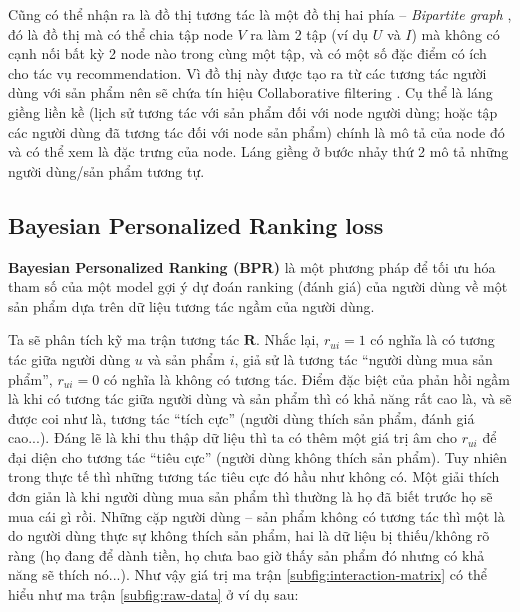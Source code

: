 Cũng có thể nhận ra là đồ thị tương tác là một đồ thị hai phía -- \textit{Bipartite graph} \cite{bipartite-graph-partition}, đó là đồ thị mà có thể chia tập node $V$ ra làm 2 tập (ví dụ $U$ và $I$) mà không có cạnh nối bất kỳ 2 node nào trong cùng một tập, và có một số đặc điểm có ích cho tác vụ recommendation. Vì đồ thị này được tạo ra từ các tương tác người dùng với sản phẩm nên sẽ chứa tín hiệu Collaborative filtering \cite{MGAT}. Cụ thể là láng giềng liền kề (lịch sử tương tác với sản phẩm đối với node người dùng; hoặc tập các người dùng đã tương tác đối với node sản phẩm) chính là mô tả của node đó và có thể xem là đặc trưng của node. Láng giềng ở bước nhảy thứ 2 mô tả những người dùng/sản phẩm tương tự.

\subsection{Bayesian Personalized Ranking loss}
\noindent \textbf{Bayesian Personalized Ranking (BPR)} \cite{BPR-loss} là một phương pháp để tối ưu hóa tham số của một model gợi ý dự đoán ranking (đánh giá) của người dùng về một sản phẩm dựa trên dữ liệu tương tác ngầm của người dùng.

Ta sẽ phân tích kỹ ma trận tương tác $\mathbf{R}$. Nhắc lại, $r_{ui} = 1$ có nghĩa là có tương tác giữa người dùng $u$ và sản phẩm $i$, giả sử là tương tác ``người dùng mua sản phẩm'', $r_{ui} = 0$ có nghĩa là không có tương tác. Điểm đặc biệt của phản hồi ngầm là khi có tương tác giữa người dùng và sản phẩm thì có khả năng rất cao là, và sẽ được coi như là, tương tác ``tích cực'' \cite{BPR-loss} (người dùng thích sản phẩm, đánh giá cao...). Đáng lẽ là khi thu thập dữ liệu thì ta có thêm một giá trị âm cho $r_{ui}$ để đại diện cho tương tác ``tiêu cực'' (người dùng không thích sản phẩm). Tuy nhiên trong thực tế thì những tương tác tiêu cực đó hầu như không có. Một giải thích đơn giản là khi người dùng mua sản phẩm thì thường là họ đã biết trước họ sẽ mua cái gì rồi. Những cặp người dùng -- sản phẩm không có tương tác thì một là do người dùng thực sự không thích sản phẩm, hai là dữ liệu bị thiếu/không rõ ràng (họ đang để dành tiền, họ chưa bao giờ thấy sản phẩm đó nhưng có khả năng sẽ thích nó...). Như vậy giá trị ma trận \ref{subfig:interaction-matrix} có thể hiểu như ma trận \ref{subfig:raw-data} ở ví dụ sau:


